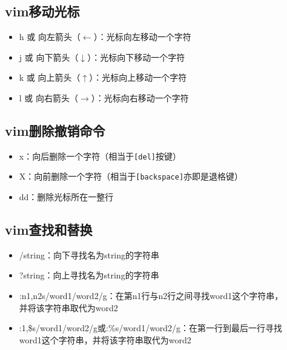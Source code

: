 \documentclass{article}
\begin{document}
\subsection{vim移动光标}
\begin{itemize}
    \item h 或 向左箭头（$\leftarrow$）：光标向左移动一个字符
    \item j 或 向下箭头（$\downarrow$）：光标向下移动一个字符
    \item k 或 向上箭头（$\uparrow$）：光标向上移动一个字符
    \item l 或 向右箭头（$\rightarrow$）：光标向右移动一个字符
\end{itemize}

\subsection{vim删除撤销命令}
\begin{itemize}
    \item x：向后删除一个字符（相当于\verb|[del]|按键）
    \item X：向前删除一个字符（相当于\verb|[backspace]|亦即是退格键）
    \item dd：删除光标所在一整行
\end{itemize}

\subsection{vim查找和替换}
\begin{itemize}
    \item /string：向下寻找名为string的字符串
    \item ?string：向上寻找名为string的字符串
    \item :n1,n2s/word1/word2/g：在第n1行与n2行之间寻找word1这个字符串，\\并将该字符串取代为word2
    \item :1,\$s/word1/word2/g或:\%s/word1/word2/g：在第一行到最后一行寻找\\word1这个字符串，并将该字符串取代为word2
\end{itemize}
\end{document}
